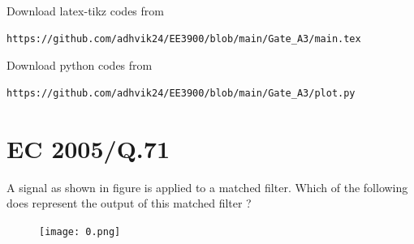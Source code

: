 \documentclass[journal,12pt,twocolumn]{IEEEtran}
\begin{document}
Download latex-tikz codes from 
%
\begin{lstlisting}
https://github.com/adhvik24/EE3900/blob/main/Gate_A3/main.tex
\end{lstlisting}
%
Download python codes from 
%
\begin{lstlisting}
https://github.com/adhvik24/EE3900/blob/main/Gate_A3/plot.py
\end{lstlisting}
\section{EC 2005/Q.71}
A signal as shown in figure is applied to a matched filter. Which of the following
does represent the output of this matched filter ?
 \begin{figure}[!htp]
\centering
 \texttt{[image: 0.png]}
 \end{figure}
\end{document}
